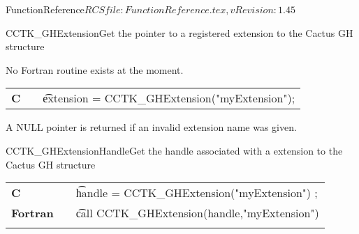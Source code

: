\begin{cactuspart}{5}{FunctionReference}{$RCSfile: FunctionReference.tex,v $}{$Revision: 1.45 $}

\begin{CCTKFunc}{CCTK\_GHExtension}{Get the pointer to a registered extension to the Cactus GH structure}
\label{CCTK-GHExtension}
\showcargs
\begin{params}
\end{params}
\begin{discussion}
No Fortran routine exists at the moment.
\end{discussion}
\begin{examples}
\begin{tabular}{@{}p{3cm}cp{11cm}}
\hfill {\bf C} && {\t extension = CCTK\_GHExtension("myExtension");}
\\
\end{tabular}
\end{examples}
\begin{errorcodes}
A NULL pointer is returned if an invalid extension name was given.
\end{errorcodes}
\end{CCTKFunc}


\begin{CCTKFunc}{CCTK\_GHExtensionHandle}{Get the handle associated with a extension to the Cactus GH structure}
\label{CCTK-GHExtensionHandle}
\showargs
\begin{params}
\end{params}
\begin{discussion}
\end{discussion}
\begin{examples}
\begin{tabular}{@{}p{3cm}cp{11cm}}
\hfill {\bf C} && {\t handle =  CCTK\_GHExtension("myExtension") ;}
\\
\hfill {\bf Fortran} && {\t call CCTK\_GHExtension(handle,"myExtension")}\\
\\
\end{tabular}
\end{examples}
\begin{errorcodes}
\end{errorcodes}
\end{CCTKFunc}




\end{cactuspart}

